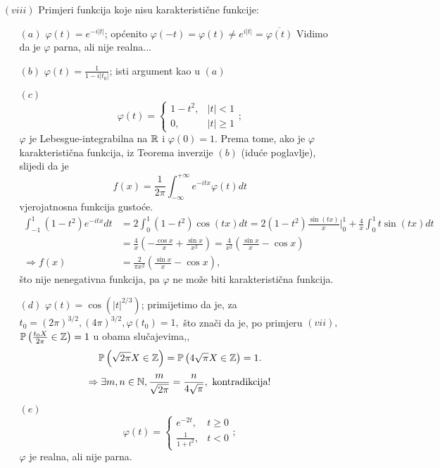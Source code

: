 \documentclass{article}
\begin{document}
\begin{enumerate}
    \item[\((viii)\)] Primjeri funkcija koje nisu karakteristične funkcije:\begin{enumerate}
        \item[\((a)\)] \(\varphi(t)=e^{-i|t|}\);  općenito \(\varphi(-t)=\varphi(t)\ne e^{i|t|}=\overline{\varphi(t)}\)  Vidimo da je \(\varphi\) parna, ali nije realna...
        \item[\((b)\)] \(\varphi(t)=\frac1{1-i|t_0|}\); isti argument kao u \((a)\)
        \item[\((c)\)] \[\varphi(t)=\begin{cases}1-t^2,&|t|<1\\0,&|t|\ge1\end{cases};\] \(\varphi\) je Lebesgue-integrabilna na \(\Bbb R\) i \(\varphi(0)=1.\) Prema tome, ako je \(\varphi\) karakteristična funkcija, iz Teorema inverzije \((b)\) (iduće poglavlje), slijedi da je \[f(x)=\frac1{2\pi}\int_{-\infty}^{+\infty}e^{-itx}\varphi(t)dt\] vjerojatnosna funkcija gustoće. \[\begin{aligned}\int_{-1}^1(1-t^2)e^{-itx}dt&=2\int_0^1(1-t^2)\cos(tx)dt=2(1-t^2)\frac{\sin(tx)}x\big|_0^1+\frac4x\int_0^1t\sin(tx)dt\\&=\frac4x\left(-\frac{\cos x}x+\frac{\sin x}{x^2}\right)=\frac4{x^2}\left(\frac{\sin x}x-\cos x\right)\\\Rightarrow f(x)&=\frac2{\pi x^2}\left(\frac{\sin x}x-\cos x\right),\end{aligned}\] što nije nenegativna funkcija, pa \(\varphi\) ne može biti karakteristična funkcija. 
        \item[\((d)\)] \(\varphi(t)=\cos\left(|t|^{2/3}\right)\); primijetimo da je, za \(t_0=\left(2\pi\right)^{3/2},\left(4\pi\right)^{3/2},\varphi(t_0)=1,\) što znači da je, po primjeru \((vii),\) \(\Bbb P\left(\frac{t_0X}{2\pi}\in\Bbb Z\right)=1\) u obama slučajevima,, \[\Bbb P\left(\sqrt{2\pi}X\in\Bbb Z\right)=\Bbb P\left(4\sqrt\pi X\in\Bbb Z\right)=1.\] \[\Rightarrow\exists m,n\in\Bbb N,\frac{m}{\sqrt{2\pi}}=\frac{n}{4\sqrt\pi},\text{ kontradikcija!}\]
        \item[\((e)\)] \[\varphi(t)=\begin{cases}e^{-2t},&t\ge0\\\frac1{1+t^2},&t<0\end{cases};\] \(\varphi\) je realna, ali nije parna.
    \end{enumerate}
\end{enumerate}
\newpage
\end{document}
